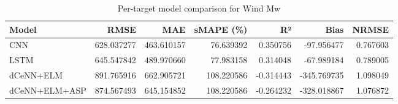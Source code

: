 \begin{table}
\caption{Per-target model comparison for Wind Mw}
\begin{tabular}{lrrrrrr}
\toprule
Model & RMSE & MAE & sMAPE (\%) & R² & Bias & NRMSE \\
\midrule
CNN & 628.037277 & 463.610157 & 76.639392 & 0.350756 & -97.956477 & 0.767603 \\
LSTM & 645.547842 & 489.970660 & 77.983158 & 0.314048 & -67.989184 & 0.789005 \\
dCeNN+ELM & 891.765916 & 662.905721 & 108.220586 & -0.314443 & -345.769735 & 1.098049 \\
dCeNN+ELM+ASP & 874.567493 & 645.154852 & 108.220586 & -0.264232 & -328.018867 & 1.076872 \\
\bottomrule
\end{tabular}
\end{table}
